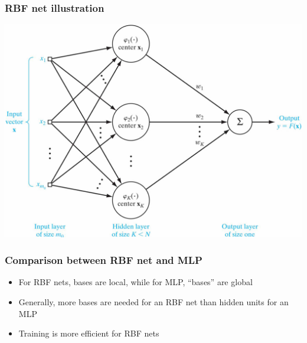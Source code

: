 \documentclass[12pt,notes,mathserif]{beamer}
\begin{document}
\begin{frame}[c]
	\frametitle{RBF net illustration}
	\begin{center}
		\includegraphics[width=0.99\linewidth]{fig/lec734.jpg}
	\end{center}
\end{frame}



\begin{frame}[c]
	\frametitle{Comparison between RBF net and MLP}
	\begin{itemize}
		\item For RBF nets, bases are local, while for MLP, ``bases'' are global
		\item Generally, more bases are needed for an RBF net than hidden units for an MLP
		\item Training is more efficient for RBF nets
	\end{itemize}
\end{frame}
\end{document}

